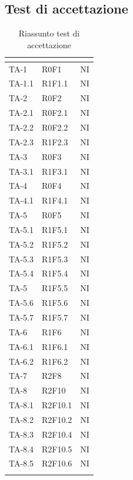 \subsection{Test di accettazione}
\normalsize
\renewcommand{\arraystretch}{1}
\begin{longtable}{|C{2.5cm}|C{2.5cm}|C{2.5cm}|}
	\hline
	\textbf{\color{title_text}{Test}} & \textbf{\color{title_text}{Requisito}} & \textbf{\color{title_text}{Stato}} \\
	\hline
	\endhead
	{TA-1} & {R0F1} & {NI}\\
	\hline
	{TA-1.1} & {R1F1.1} 
	& {NI}\\
	\hline
	{TA-2} & {R0F2} 
	& {NI}\\
	\hline
	{TA-2.1} & {R0F2.1}
	& {NI}\\
	\hline
	{TA-2.2} & {R0F2.2}
	& {NI}\\
	\hline
	{TA-2.3} & {R1F2.3} 
	& {NI}\\
	\hline
	{TA-3} & {R0F3} 
	& {NI}\\
	\hline
	{TA-3.1} & {R1F3.1}
	& {NI}\\
	\hline
	{TA-4} & {R0F4}
	& {NI}\\
	\hline
	{TA-4.1} & {R1F4.1}
	& {NI}\\
	\hline
	{TA-5} & {R0F5}
	& {NI}\\
	\hline
	{TA-5.1} & {R1F5.1}
	& {NI}\\
	\hline
	{TA-5.2} & {R1F5.2}
	& {NI}\\
	\hline
	{TA-5.3} & {R1F5.3}
	& {NI}\\
	\hline
	{TA-5.4} & {R1F5.4}
	& {NI}\\
	\hline
	{TA-5} & {R1F5.5}
	& {NI}\\
	\hline
	{TA-5.6} & {R1F5.6}
	& {NI}\\
	\hline
	{TA-5.7} & {R1F5.7}
	& {NI}\\
	\hline
	{TA-6} & {R1F6}
	& {NI}\\
	\hline
	{TA-6.1} & {R1F6.1}
	& {NI}\\
	\hline
	{TA-6.2} & {R1F6.2}
	& {NI}\\
	\hline
	{TA-7} & {R2F8}
	& {NI}\\
	\hline
	{TA-8} & {R2F10}
	& {NI}\\
	\hline
	{TA-8.1} & {R2F10.1}
	& {NI}\\
	\hline
	{TA-8.2} & {R2F10.2}
	& {NI}\\
	\hline
	{TA-8.3} & {R2F10.4}
	& {NI}\\
	\hline
	{TA-8.4} & {R2F10.5}
	& {NI}\\
	\hline
	{TA-8.5} & {R2F10.6}
	& {NI}\\
	\hline
	\caption{Riassunto test di accettazione}
	\label{tabella:riassunto ta}
\end{longtable}
